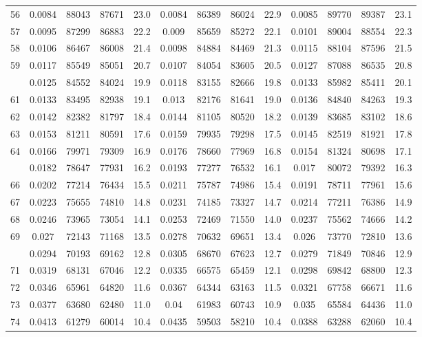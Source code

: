 \documentclass[
  14pt,
]{article}
\begin{document}
\begin{longtable}[t]{lcccccccccccc}
56 & 0.0084 & 88043 & 87671 & 23.0 & 0.0084 & 86389 & 86024 & 22.9 & 0.0085 & 89770 & 89387 & 23.1\\
57 & 0.0095 & 87299 & 86883 & 22.2 & 0.009 & 85659 & 85272 & 22.1 & 0.0101 & 89004 & 88554 & 22.3\\
58 & 0.0106 & 86467 & 86008 & 21.4 & 0.0098 & 84884 & 84469 & 21.3 & 0.0115 & 88104 & 87596 & 21.5\\
59 & 0.0117 & 85549 & 85051 & 20.7 & 0.0107 & 84054 & 83605 & 20.5 & 0.0127 & 87088 & 86535 & 20.8\\
\addlinespace
60 & 0.0125 & 84552 & 84024 & 19.9 & 0.0118 & 83155 & 82666 & 19.8 & 0.0133 & 85982 & 85411 & 20.1\\
61 & 0.0133 & 83495 & 82938 & 19.1 & 0.013 & 82176 & 81641 & 19.0 & 0.0136 & 84840 & 84263 & 19.3\\
62 & 0.0142 & 82382 & 81797 & 18.4 & 0.0144 & 81105 & 80520 & 18.2 & 0.0139 & 83685 & 83102 & 18.6\\
63 & 0.0153 & 81211 & 80591 & 17.6 & 0.0159 & 79935 & 79298 & 17.5 & 0.0145 & 82519 & 81921 & 17.8\\
64 & 0.0166 & 79971 & 79309 & 16.9 & 0.0176 & 78660 & 77969 & 16.8 & 0.0154 & 81324 & 80698 & 17.1\\
\addlinespace
65 & 0.0182 & 78647 & 77931 & 16.2 & 0.0193 & 77277 & 76532 & 16.1 & 0.017 & 80072 & 79392 & 16.3\\
66 & 0.0202 & 77214 & 76434 & 15.5 & 0.0211 & 75787 & 74986 & 15.4 & 0.0191 & 78711 & 77961 & 15.6\\
67 & 0.0223 & 75655 & 74810 & 14.8 & 0.0231 & 74185 & 73327 & 14.7 & 0.0214 & 77211 & 76386 & 14.9\\
68 & 0.0246 & 73965 & 73054 & 14.1 & 0.0253 & 72469 & 71550 & 14.0 & 0.0237 & 75562 & 74666 & 14.2\\
69 & 0.027 & 72143 & 71168 & 13.5 & 0.0278 & 70632 & 69651 & 13.4 & 0.026 & 73770 & 72810 & 13.6\\
\addlinespace
70 & 0.0294 & 70193 & 69162 & 12.8 & 0.0305 & 68670 & 67623 & 12.7 & 0.0279 & 71849 & 70846 & 12.9\\
71 & 0.0319 & 68131 & 67046 & 12.2 & 0.0335 & 66575 & 65459 & 12.1 & 0.0298 & 69842 & 68800 & 12.3\\
72 & 0.0346 & 65961 & 64820 & 11.6 & 0.0367 & 64344 & 63163 & 11.5 & 0.0321 & 67758 & 66671 & 11.6\\
73 & 0.0377 & 63680 & 62480 & 11.0 & 0.04 & 61983 & 60743 & 10.9 & 0.035 & 65584 & 64436 & 11.0\\
74 & 0.0413 & 61279 & 60014 & 10.4 & 0.0435 & 59503 & 58210 & 10.4 & 0.0388 & 63288 & 62060 & 10.4\\

\end{longtable}
\end{document}
